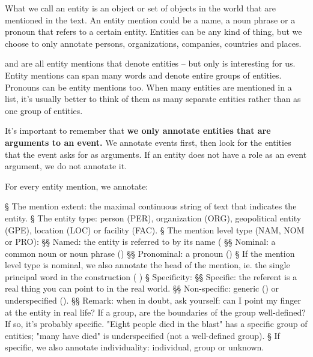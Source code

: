What we call an entity is an object or set of objects in the world that are mentioned in the text. An entity mention could be a name, a noun phrase or a pronoun that refers to a certain entity. \cite{LDC2016.rich_ere} Entities can be any kind of thing, but we choose to only annotate persons, organizations, companies, countries and places.

\begin{exe}
    \ex {}
        \expl {}  and  are all entity mentions that denote entities -- but only  is interesting for us.
    \ex {}
        \expl Entity mentions can span many words and denote entire groups of entities.
    \ex {}
        \expl Pronouns can be entity mentions too. When many entities are mentioned in a list, it's usually better to think of them as many separate entities rather than as one group of entities.
\end{exe}

It's important to remember that \textbf{we only annotate entities that are arguments to an event.} We annotate events first, then look for the entities that the event asks for as arguments. If an entity does not have a role as an event argument, we do not annotate it.

For every entity mention, we annotate: 
\begin{el}
    § The mention extent: the maximal continuous string of text that indicates the entity.
    § The entity type: person (PER), organization (ORG), geopolitical entity (GPE), location (LOC) or facility (FAC).
    § The mention level type (NAM, NOM or PRO):
        §§ Named: the entity is referred to by its name (
        §§ Nominal: a common noun or noun phrase ()
        §§ Pronominal: a pronoun ()
    § If the mention level type is nominal, we also annotate the head of the mention, ie. the single principal word in the construction ( )
    § Specificity:
        §§ Specific: the referent is a real thing you can point to in the real world.
        §§ Non-specific: generic () or underspecified ().
        §§ Remark: when in doubt, ask yourself: can I point my finger at the entity in real life? If a group, are the boundaries of the group well-defined? If so, it's probably specific. "Eight people died in the blast" has a specific group of entities; "many have died" is underspecified (not a well-defined group).
    § If specific, we also annotate individuality: individual, group or unknown.
\end{el}

